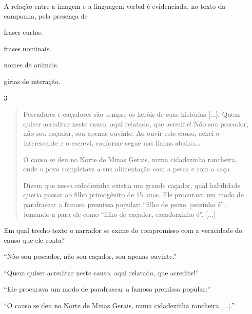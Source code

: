 
A relação entre a imagem e a linguagem verbal é evidenciada, no texto da
campanha, pela presença de

\begin{escolha}
\item frases curtas.

\item frases nominais.

\item nomes de animais.

\item gírias de interação.
\end{escolha}

\num{3}

\begin{quote}
Pescadores e caçadores são sempre os heróis de suas histórias {[}...{]}.
Quem quiser acreditar neste causo, aqui relatado, que acredite! Não sou
pescador, não sou caçador, sou apenas ouvinte. Ao ouvir este causo,
achei-o interessante e o escrevi, conforme segue nas linhas abaixo...

O causo se deu no Norte de Minas Gerais, numa cidadezinha rancheira,
onde o povo completava a sua alimentação com a pesca e com a caça.

Dizem que nessa cidadezinha existia um grande caçador, qual habilidade
queria passar ao filho primogênito de 15 anos. Ele procurava um modo de
parafrasear a famosa premissa popular: ``filho de peixe, peixinho é'',
tomando-a para ele como ``filho de caçador, caçadorzinho é''. {[}...{]}
\end{quote}


Em qual trecho texto o narrador se exime do compromisso com a veracidade
do causo que ele conta?

\begin{escolha}
\item ``Não sou pescador, não sou caçador, sou apenas ouvinte.''

\item ``Quem quiser acreditar neste causo, aqui relatado, que acredite!''

\item ``Ele procurava um modo de parafrasear a famosa premissa popular:''

\item ``O causo se deu no Norte de Minas Gerais, numa cidadezinha rancheira
{[}...{]}.''
\end{escolha}

